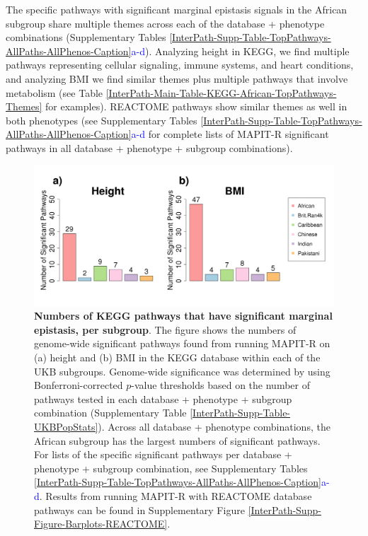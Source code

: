 \documentclass[12pt,a4paper]{article}
\begin{document}
The specific pathways with significant marginal epistasis signals in the African subgroup share multiple themes across each of the database + phenotype combinations (Supplementary Tables \ref{InterPath-Supp-Table-TopPathways-AllPaths-AllPhenos-Caption}\textcolor{blue}{a-d}). Analyzing height in KEGG, we find multiple pathways representing cellular signaling, immune systems, and heart conditions, and analyzing BMI we find similar themes plus multiple pathways that involve metabolism (see Table \ref{InterPath-Main-Table-KEGG-African-TopPathways-Themes} for examples). REACTOME pathways show similar themes as well in both phenotypes (see Supplementary Tables \ref{InterPath-Supp-Table-TopPathways-AllPaths-AllPhenos-Caption}\textcolor{blue}{a-d} for complete lists of MAPIT-R significant pathways in all database + phenotype + subgroup combinations).  


\begin{figure}[htb]
\centering
\hspace*{-.9cm}
\includegraphics[scale=.45]{Images/Main/InterPath_Main_Figure_Barplots_KEGG_vs4.png}
\caption[TBD]{\textbf{Numbers of KEGG pathways that have significant marginal epistasis, per subgroup}. The figure shows the numbers of genome-wide significant pathways found from running MAPIT-R on (a) height and (b) BMI in the KEGG database within each of the UKB subgroups.  Genome-wide significance was determined by using Bonferroni-corrected $p$-value thresholds based on the number of pathways tested in each database + phenotype + subgroup combination (Supplementary Table \ref{InterPath-Supp-Table-UKBPopStats}). Across all database + phenotype combinations, the African subgroup has the largest numbers of significant pathways. For lists of the specific significant pathways per database + phenotype + subgroup combination, see Supplementary Tables \ref{InterPath-Supp-Table-TopPathways-AllPaths-AllPhenos-Caption}\textcolor{blue}{a-d}. Results from running MAPIT-R with REACTOME database pathways can be found in Supplementary Figure \ref{InterPath-Supp-Figure-Barplots-REACTOME}.}
\label{InterPath-Main-Figure-Barplots-KEGG}
\end{figure}
\end{document}
